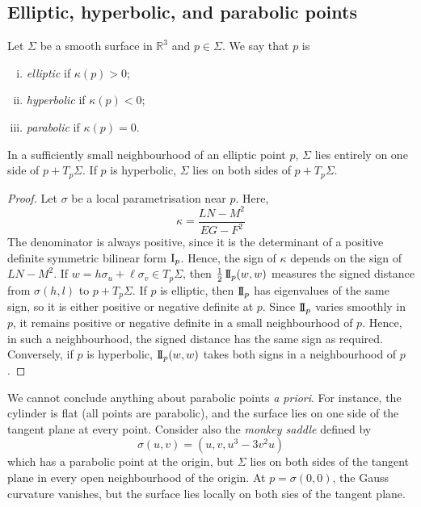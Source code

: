 \subsection{Elliptic, hyperbolic, and parabolic points}
\begin{definition}
	Let \( \Sigma \) be a smooth surface in \( \mathbb R^3 \) and \( p \in \Sigma \).
	We say that \( p \) is
	\begin{enumerate}[(i)]
		\item \textit{elliptic} if \( \kappa(p) > 0 \);
		\item \textit{hyperbolic} if \( \kappa(p) < 0 \);
		\item \textit{parabolic} if \( \kappa(p) = 0 \).
	\end{enumerate}
\end{definition}
\begin{lemma}
	In a sufficiently small neighbourhood of an elliptic point \( p \), \( \Sigma \) lies entirely on one side of \( p + T_p \Sigma \).
	If \( p \) is hyperbolic, \( \Sigma \) lies on both sides of \( p + T_p \Sigma \).
\end{lemma}
\begin{proof}
	Let \( \sigma \) be a local parametrisation near \( p \).
	Here,
	\[ \kappa = \frac{LN-M^2}{EG-F^2} \]
	The denominator is always positive, since it is the determinant of a positive definite symmetric bilinear form \( \operatorname{\mathrm{I}}_p \).
	Hence, the sign of \( \kappa \) depends on the sign of \( LN-M^2 \).
	If \( w = h \sigma_u + \ell \sigma_v \in T_p \Sigma \), then \( \frac{1}{2} \operatorname{\mathrm{I\!I}}_p(w,w) \) measures the signed distance from \( \sigma(h,l) \) to \( p + T_p \Sigma \).
	If \( p \) is elliptic, then \( \operatorname{\mathrm{I\!I}}_p \) has eigenvalues of the same sign, so it is either positive or negative definite at \( p \).
	Since \( \operatorname{\mathrm{I\!I}}_p \) varies smoothly in \( p \), it remains positive or negative definite in a small neighbourhood of \( p \).
	Hence, in such a neighbourhood, the signed distance has the same sign as required.
	Conversely, if \( p \) is hyperbolic, \( \operatorname{\mathrm{I\!I}}_p(w,w) \) takes both signs in a neighbourhood of \( p \).
\end{proof}
\begin{remark}
	We cannot conclude anything about parabolic points \textit{a priori}.
	For instance, the cylinder is flat (all points are parabolic), and the surface lies on one side of the tangent plane at every point.
	Consider also the \textit{monkey saddle} defined by
	\[ \sigma(u,v) = (u,v,u^3 - 3v^2 u) \]
	which has a parabolic point at the origin, but \( \Sigma \) lies on both sides of the tangent plane in every open neighbourhood of the origin.
	At \( p = \sigma(0,0) \), the Gauss curvature vanishes, but the surface lies locally on both sies of the tangent plane.
\end{remark}

